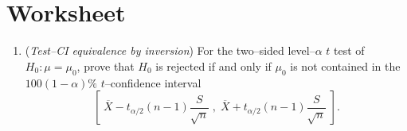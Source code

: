 \documentclass[12pt]{article}
\begin{document}
\clearpage


\section*{Worksheet}

\begin{enumerate}\itemsep1.2em












\item (\emph{Test–CI equivalence by inversion})  
For the two–sided level–$\alpha$ $t$ test of $H_0:\mu=\mu_0$, prove that $H_0$ is rejected if and only if $\mu_0$ is not contained in the $100(1-\alpha)\%$ $t$–confidence interval
\[
\left[\;\overline{X}-t_{\alpha/2}(n-1)\frac{S}{\sqrt{n}}\;,\;\overline{X}+t_{\alpha/2}(n-1)\frac{S}{\sqrt{n}}\;\right].
\]
\vspace{16em}


\end{enumerate}
\end{document}
